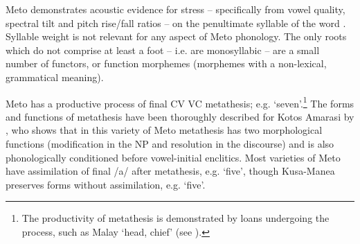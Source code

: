\documentclass[output=paper]{langscibook}
\begin{document}
\begin{table}
\caption{Amfo{\Q}an root structures}\label{tab:RootStucs}
\end{table}

Meto demonstrates acoustic evidence for stress -- specifically from vowel quality, spectral tilt and pitch rise/fall ratios --  on the  penultimate syllable of the word \citep{cu-PhD}. 
Syllable weight is not relevant for any aspect of Meto phonology.
The only roots which do not comprise at least a foot -- i.e. are monosyllabic --  are a small number of functors,
or function morphemes (morphemes with a non-lexical, grammatical meaning). 

Meto has a productive process of final CV {\ra} VC metathesis;
e.g.  {\ra}  `seven'.\footnote{The productivity of metathesis is demonstrated by loans undergoing the process,  such
as Malay  {\ra}  `head, chief' (see \citealt[273 ff.]{ed20}).}
The forms and functions of metathesis have been thoroughly
described for Kotos Amarasi by \citet{ed20}, who shows that
in this variety of Meto metathesis has two morphological functions
(modification in the NP and resolution in the discourse)
and is also phonologically conditioned before vowel-initial enclitics.
Most varieties of Meto have assimilation of final /a/ after metathesis,
e.g.  {\ra}  `five', though Kusa-Manea preserves
forms without assimilation, e.g.  `five'.
\end{document}
